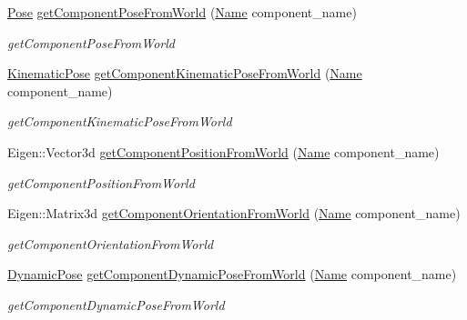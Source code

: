 \begin{DoxyCompactItemize}
\hyperlink{structrobotis__manipulator_1_1_pose}{Pose} \hyperlink{classrobotis__manipulator_1_1_manipulator_ae48083e42b02bbf672f43b2f77979f21}{get\+Component\+Pose\+From\+World} (\hyperlink{namespacerobotis__manipulator_a08c2d25e77a01ad75b9bb740f8ce4765}{Name} component\+\_\+name)
\begin{DoxyCompactList}\small\item\em get\+Component\+Pose\+From\+World \end{DoxyCompactList}\item 
\hyperlink{structrobotis__manipulator_1_1_kinematic_pose}{Kinematic\+Pose} \hyperlink{classrobotis__manipulator_1_1_manipulator_abf86af18bdea1094c29763366167bfd5}{get\+Component\+Kinematic\+Pose\+From\+World} (\hyperlink{namespacerobotis__manipulator_a08c2d25e77a01ad75b9bb740f8ce4765}{Name} component\+\_\+name)
\begin{DoxyCompactList}\small\item\em get\+Component\+Kinematic\+Pose\+From\+World \end{DoxyCompactList}\item 
Eigen\+::\+Vector3d \hyperlink{classrobotis__manipulator_1_1_manipulator_a04b2efdf66bc0e4bd04dc9aafd9f2d47}{get\+Component\+Position\+From\+World} (\hyperlink{namespacerobotis__manipulator_a08c2d25e77a01ad75b9bb740f8ce4765}{Name} component\+\_\+name)
\begin{DoxyCompactList}\small\item\em get\+Component\+Position\+From\+World \end{DoxyCompactList}\item 
Eigen\+::\+Matrix3d \hyperlink{classrobotis__manipulator_1_1_manipulator_a9228f1f4b7fd627da2a618b79b2f0c0b}{get\+Component\+Orientation\+From\+World} (\hyperlink{namespacerobotis__manipulator_a08c2d25e77a01ad75b9bb740f8ce4765}{Name} component\+\_\+name)
\begin{DoxyCompactList}\small\item\em get\+Component\+Orientation\+From\+World \end{DoxyCompactList}\item 
\hyperlink{structrobotis__manipulator_1_1_dynamic_pose}{Dynamic\+Pose} \hyperlink{classrobotis__manipulator_1_1_manipulator_abebe232d3d0f532920d38194296733bf}{get\+Component\+Dynamic\+Pose\+From\+World} (\hyperlink{namespacerobotis__manipulator_a08c2d25e77a01ad75b9bb740f8ce4765}{Name} component\+\_\+name)
\begin{DoxyCompactList}\small\item\em get\+Component\+Dynamic\+Pose\+From\+World \end{DoxyCompactList}\item 

\end{DoxyCompactItemize}
